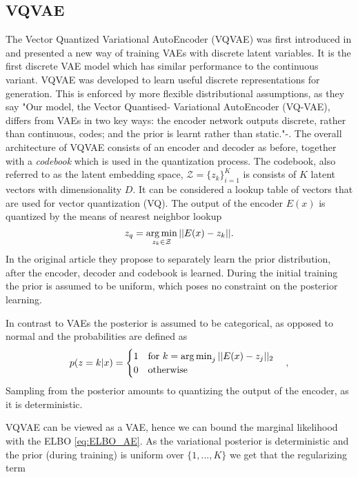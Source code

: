 \documentclass[../../thesis.tex]{subfiles}
\begin{document}
\subsection{VQVAE}
The Vector Quantized Variational AutoEncoder (VQVAE) was first introduced in \cite{VQVAE} and presented a new way of training VAEs with discrete latent variables. It is the first discrete VAE model which has similar performance to the continuous variant. VQVAE was developed to learn useful discrete representations for generation. This is enforced by more flexible distributional assumptions, as they say "Our model, the Vector Quantised-
Variational AutoEncoder (VQ-VAE), differs from VAEs in two key ways: the
encoder network outputs discrete, rather than continuous, codes; and the prior
is learnt rather than static."-\cite{VQVAE}. 
\newline
The overall architecture of VQVAE consists of an encoder and decoder as before, together with a \textit{codebook} which is used in the quantization process. The codebook, also referred to as the latent embedding space, $\mathcal{Z} = \{z_k\}_{i=1}^K$ is consists of $K$ latent vectors with dimensionality $D$. It can be considered a lookup table of vectors that are used for vector quantization (VQ). The output of the encoder $E(x)$ is quantized by the means of nearest neighbor lookup
\begin{equation}
    z_q = \operatorname*{arg\,min}_{z_k\in\mathcal{Z}} ||E(x)-z_k||.
\end{equation}
In the original article \cite{VQVAE} they propose to separately learn the prior distribution, after the encoder, decoder and codebook is learned. During the initial training the prior is assumed to be uniform, which poses no constraint on the posterior learning. \newline

In contrast to VAEs the posterior is assumed to be categorical, as opposed to normal and the probabilities are defined as
\begin{equation}
    p(z=k | x) = 
    \begin{cases} 
        1 \quad \text{for }k = \operatorname*{arg\,min}_j||E(x) - z_j||_2 \\
        0 \quad \text{otherwise}
    \end{cases},
\end{equation}
Sampling from the posterior amounts to quantizing the output of the encoder, as it is deterministic. \newline

VQVAE can be viewed as a VAE, hence we can bound the marginal likelihood with the ELBO \ref{eq:ELBO_AE}. As the variational posterior is deterministic and the prior (during training) is uniform over $\{1,...,K\}$ we get that the regularizing term
\end{document}
